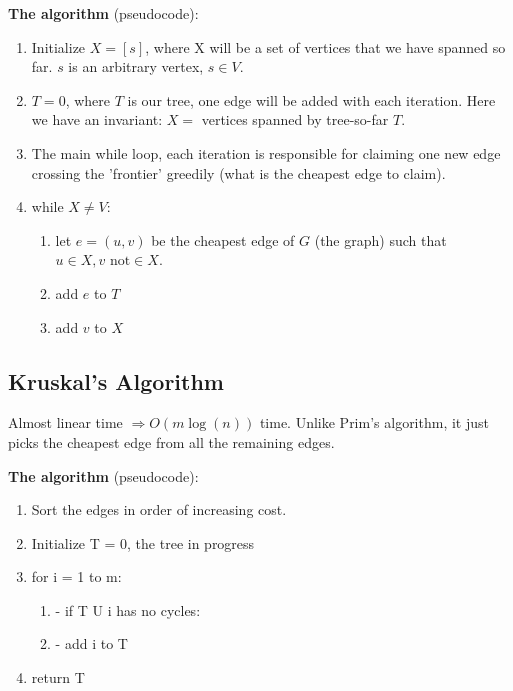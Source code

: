 \documentclass{article}
\begin{document}
\textbf{The algorithm} (pseudocode):
\
\begin{enumerate}
  \item Initialize $X = [s]$, where X will be a set of vertices that we have spanned so far. $s$ is an arbitrary vertex, $s \in V$.
  \item $T = 0$, where $T$ is our tree, one edge will be added with each iteration.  Here we have an invariant: $X =$ vertices spanned by tree-so-far $T$. 
  \item The main while loop, each iteration is responsible for claiming one new edge crossing the 'frontier' greedily (what is the cheapest edge to claim).
  \item while $X \neq V:$
    \
    \begin{enumerate}
      \item let $e = (u,v)$ be the cheapest edge of $G$ (the graph) such that $u \in X, v \text{ not} \in X$.
      \item add $e$ to $T$
      \item add $v$ to $X$
    \end{enumerate}
\end{enumerate}

\subsection{Kruskal's Algorithm}
Almost linear time $\Rightarrow O(m\log(n))$ time.  Unlike Prim's algorithm, it just picks the cheapest edge from
all the remaining edges.

\textbf{The algorithm} (pseudocode):
\
\begin{enumerate}
\item Sort the edges in order of increasing cost.
\item Initialize T = 0, the tree in progress
\item for i = 1 to m:
\
\begin{enumerate}
\item - if T U {i} has no cycles:
\item - add i to T
\end{enumerate}
\item return T
\end{enumerate}
\end{document}
